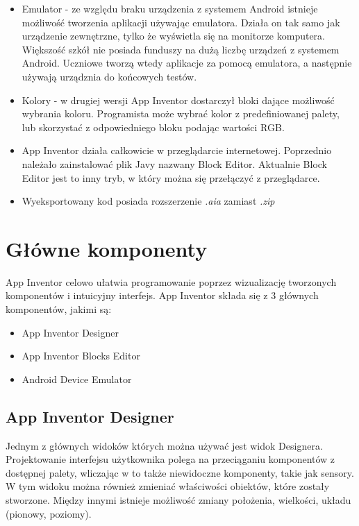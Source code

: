 \begin{itemize}
\item Emulator - ze względu braku urządzenia z systemem Android istnieje możliwość tworzenia aplikacji używając emulatora. Działa on tak samo jak urządzenie zewnętrzne, tylko że wyświetla się na monitorze komputera. Większość szkół nie posiada funduszy na dużą liczbę urządzeń z systemem Android. Uczniowe tworzą wtedy aplikacje za pomocą emulatora, a następnie używają urządznia do końcowych testów.\cite{android:47}

\item Kolory - w drugiej wersji App Inventor dostarczył bloki dające możliwość wybrania koloru. Programista może wybrać kolor z predefiniowanej palety, lub skorzystać z odpowiedniego bloku podając wartości RGB.\cite{android:48}

\item App Inventor działa całkowicie w przeglądarcie internetowej. Poprzednio należało zainstalować plik Javy nazwany Block Editor. Aktualnie Block Editor jest to inny tryb, w który można się przełączyć z przeglądarce.\cite{android:43}

\item Wyeksportowany kod posiada rozszerzenie \emph{.aia} zamiast \emph{.zip} \cite{android:43}

\end{itemize}

\section{Główne komponenty}
\label{c22}

App Inventor celowo ułatwia programowanie poprzez wizualizację tworzonych komponentów i intuicyjny interfejs. App Inventor składa się z 3 głównych komponentów, jakimi są:
\begin{itemize}
\item App Inventor Designer
\item App Inventor Blocks Editor
\item Android Device Emulator
\end{itemize}

\subsection{App Inventor Designer}
\label{c221}

Jednym z głównych widoków których można używać jest widok Designera. Projektowanie interfejsu użytkownika polega na przeciąganiu komponentów z dostępnej palety, wliczając w to także niewidoczne komponenty, takie jak sensory. W tym widoku można również zmieniać właściwości obiektów, które zostały stworzone. Między innymi istnieje możliwość zmiany położenia, wielkości, układu (pionowy, poziomy).

